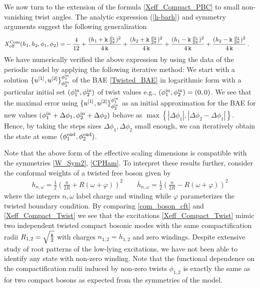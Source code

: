 \documentclass[12pt]{article}
\numberwithin{equation}{section}
\newcommand{\kk}{{\tt k}}
\begin{document}
We now turn to the extension of the formula \eqref{Xeff_Compact_PBC} to small non-vanishing twist angles. The analytic expression (\ref{h-barh}) and symmetry arguments suggest the following generalization
\begin{align}
    X^{\rm{Com}}_{\rm{eff}}(h_1,h_2,\phi_1,\phi_2)=& -\frac{4}{12}+\frac{(h_1+           \kk \,   \frac{\phi_1}{2\pi}      )^2}{4 \,\kk}
     +\frac{( h_2+           \kk \,   \frac{\phi_2}{2\pi}        )^2}{4 \,\kk}+\frac{( h_1-           \kk \,   \frac{\phi_1}{2\pi}      )^2}{4\, \kk}+\frac{( h_2-           \kk \,  \frac{\phi_2}{2\pi}      )^2}{4\, \kk}\,.\label{Xeff_Compact_Twist}
\end{align}
We have numerically verified the above expression by using the data of the periodic model by applying the following iterative method: We start with a solution $\{u^{[1]},u^{[2]}\}^{\phi^ { \rm{in}}_1}_{\phi^ {\rm{in}}_2}$ of the BAE \eqref{Twisted_BAE} in logarithmic form with a particular
initial set $(\phi^{ \rm{in}}_1,\phi^{ \rm{in}}_{2})$ of twist
values  e.g., $(\phi^{ \rm{in}}_1,\phi^{ \rm{in}}_{2})=(0,0)$. We see that the maximal error using $\{u^{[1]},u^{[2]}\}^{\phi^{ \rm{in}}_1}_{\phi^{ \rm{in}}_2}$ as an initial approximation for the BAE for new values $(\phi^{ \rm{in}}_1+\Delta \phi_1,\phi^{ \rm{in}}_{2}+\Delta \phi_2)$ behave as $\max\left\{|\Delta\phi_1|,|\Delta\phi_2-\Delta\phi_1|\right\}$. Hence, by taking the steps sizes  $\Delta \phi_1,\Delta \phi_2$ small enough, we can iteratively obtain the state at some $(\phi^{ \rm{end}}_1,\phi^{ \rm{end}}_{2})$. 


Note that the above form of the effective scaling dimensions is compatible with the symmetries \eqref{W_Sym2},  \eqref{CPHam}. To interpret these results further, consider the conformal weights of a twisted free boson given by \cite{DiFr97}
\begin{align}
    h_{n,\omega}=\frac{1}{2}\left(\frac{n}{2R}+R (\omega+\varphi)\right)^2 \qquad  \bar{h}_{n,\omega}=\frac{1}{2}\left(\frac{n}{2R}- R (\omega+\varphi)\right)^2
    \label{com_boson_cft}
\end{align}
where the integers $n, \omega$ label charge and winding while $\varphi$ parameterizes the twisted boundary condition. By comparing \eqref{com_boson_cft} and \eqref{Xeff_Compact_Twist} we see that the excitations \eqref{Xeff_Compact_Twist} mimic two independent twisted compact bosonic modes with the same compactification radii $R_{1,2}=\sqrt{\frac{\kk}{2}}$ with  charges $n_{1,2}=h_{1,2}$ and zero windings. Despite extensive study of root patterns of the low-lying excitations, we have not been able to identify any state with non-zero winding. Note that the functional dependence on the compactification radii induced by non-zero twists $\phi_{1,2}$ is exactly the same as for two compact bosons as expected from the symmetries of the model.
\end{document}
